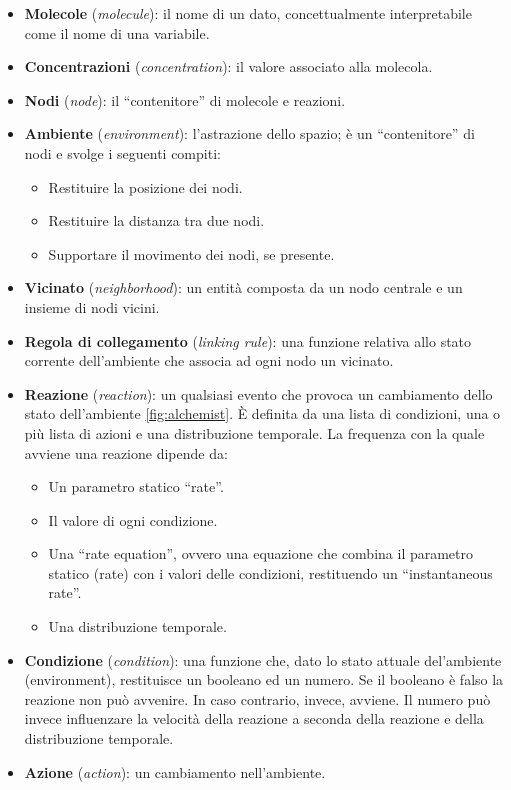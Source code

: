 \begin{itemize}
    \item \textbf{Molecole} (\textit{molecule}): il nome di un dato, concettualmente interpretabile come il nome di una variabile.
    \item \textbf{Concentrazioni} (\textit{concentration}): il valore associato alla molecola.
    \item \textbf{Nodi}\label{node} (\textit{node}): il ``contenitore'' di molecole e reazioni.
    \item \textbf{Ambiente} (\textit{environment}): l'astrazione dello spazio; è un “contenitore” di nodi e svolge i seguenti compiti:
    \begin{itemize}
        \item Restituire la posizione dei nodi.
        \item Restituire la distanza tra due nodi.
        \item Supportare il movimento dei nodi, se presente.
    \end{itemize}
    \item \textbf{Vicinato} (\textit{neighborhood}): un entità composta da un nodo centrale e un insieme di nodi vicini.
    \item \textbf{Regola di collegamento} (\textit{linking rule}): una funzione relativa allo stato corrente dell'ambiente che associa ad ogni nodo un vicinato.
    \item \textbf{Reazione} (\textit{reaction}): un qualsiasi evento che provoca un cambiamento dello stato dell'ambiente \cref{fig:alchemist}. È definita da una lista di condizioni, una o più lista di azioni e una distribuzione temporale. La frequenza con la quale avviene una reazione dipende da:
    \begin{itemize}
        \item Un parametro statico ``rate''.
        \item Il valore di ogni condizione.
        \item Una ``rate equation'', ovvero una equazione che combina il parametro statico (rate) con i valori delle condizioni, restituendo un ``instantaneous rate''.
        \item Una distribuzione temporale.
    \end{itemize}
    \item \textbf{Condizione} (\textit{condition}): una funzione che, dato lo stato attuale del'ambiente (environment), restituisce un booleano ed un numero. Se il booleano è falso la reazione non può avvenire. In caso contrario, invece, avviene. Il numero può invece influenzare la velocità della reazione a seconda della reazione e della distribuzione temporale.
    \item \textbf{Azione} (\textit{action}): un cambiamento nell'ambiente.
\end{itemize}
